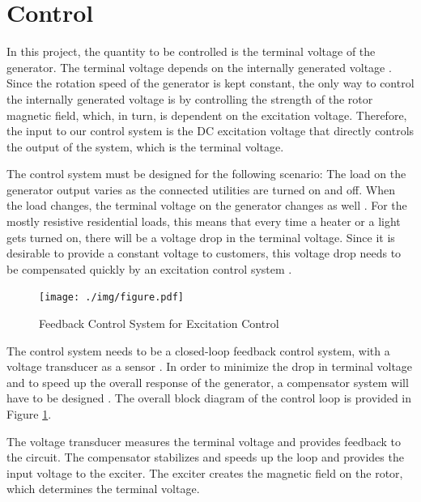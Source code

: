 \section{Control}
In this project, the quantity to be controlled is the terminal voltage of the generator. The terminal voltage depends on the internally generated voltage \cite{machinery}. Since the rotation speed of the generator is kept constant, the only way to control the internally generated voltage is by controlling the strength of the rotor magnetic field, which, in turn, is dependent on the excitation voltage.
Therefore, the input to our control system is the DC excitation voltage that directly controls the output of the system, which is the terminal voltage.

The control system must be designed for the following scenario: The load on the generator output varies as the connected utilities are turned on and off. When the load changes, the terminal voltage on the generator changes as well \cite{machinery}. For the mostly resistive residential loads, this means that every time a heater or a light gets turned on, there will be a voltage drop in the terminal voltage. Since it is desirable to provide a constant voltage to customers, this voltage drop needs to be compensated quickly by an excitation control system \cite{modern}.

\begin{figure}[h!]
\begin{center}
\texttt{[image: ./img/figure.pdf]}
\end{center}
\caption{Feedback Control System for Excitation Control}
\label{fig:sys}
\end{figure}

The control system needs to be a closed-loop feedback control system, with a voltage transducer as a sensor \cite{modern}. In order to minimize the drop in terminal voltage and to speed up the overall response of the generator, a compensator system will have to be designed \cite{modern}. The overall block diagram of the control loop is provided in Figure \ref{fig:sys}.

The voltage transducer measures the terminal voltage and provides feedback to the circuit.  The compensator stabilizes and speeds up the loop and provides the input voltage to the exciter. The exciter creates the magnetic field on the rotor, which determines the terminal voltage.

